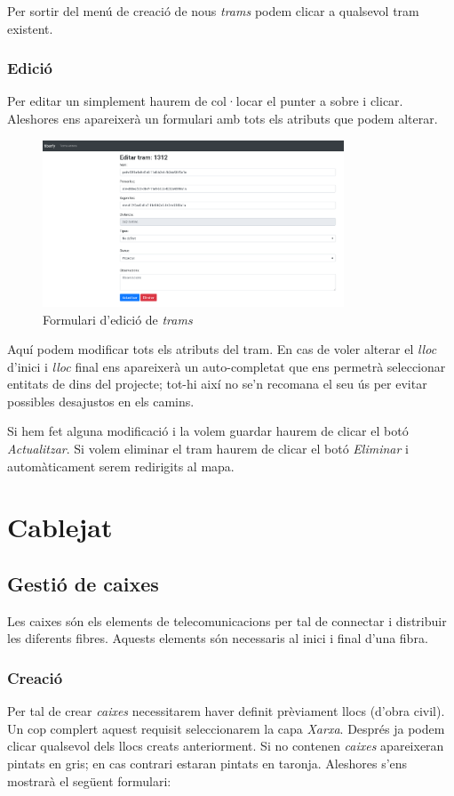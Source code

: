 \documentclass[a4paper]{article}
\begin{document}
	Per sortir del menú de creació de nous \emph{trams} podem clicar a qualsevol tram existent.
	
	\subsubsection{Edició}
	Per editar un simplement haurem de col·locar el punter a sobre i clicar. Aleshores ens apareixerà un formulari amb tots els atributs que podem alterar.
	
	\begin{figure}[H]
		\centering
		\includegraphics[width=0.8\textwidth]{images/path_edit.png}
		\caption{Formulari d'edició de \emph{trams}}
	\end{figure}
	Aquí podem modificar tots els atributs del tram. En cas de voler alterar el \emph{lloc} d'inici i \emph{lloc} final ens apareixerà un auto-completat que ens permetrà seleccionar entitats de dins del projecte; tot-hi així no se'n recomana el seu ús per evitar possibles desajustos en els camins.
	
	Si hem fet alguna modificació i la volem guardar haurem de clicar el botó \emph{Actualitzar}.
	Si volem eliminar el tram haurem de clicar el botó \emph{Eliminar} i automàticament serem redirigits al mapa.
	
	\newpage
	\section{Cablejat}
	\subsection{Gestió de caixes}
	Les caixes són els elements de telecomunicacions per tal de connectar i distribuir les diferents fibres. Aquests elements són necessaris al inici i final d'una fibra.
	
	\subsubsection{Creació}
	Per tal de crear \emph{caixes} necessitarem haver definit prèviament llocs (d'obra civil). Un cop complert aquest requisit seleccionarem la capa \emph{Xarxa}. Després ja podem clicar qualsevol dels llocs creats anteriorment. Si no contenen \emph{caixes} apareixeran pintats en gris; en cas contrari estaran pintats en taronja. Aleshores s'ens mostrarà el següent formulari:
	
\end{document}
